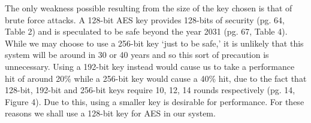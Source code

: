 \documentclass[12pt, titlepage]{article}
\begin{document}
The only weakness possible resulting from the size of the key chosen is that of brute force attacks. A 128-bit AES key provides 128-bits of security (pg. 64, Table 2) and is speculated to be safe beyond the year 2031 (pg. 67, Table 4).\cite{nistKeys}
While we may choose to use a 256-bit key `just to be safe,' it is unlikely that this system will be around in 30 or 40 years and so this sort of precaution is unnecessary. Using a 192-bit key instead would cause us to take a performance hit of around 20\% while a 256-bit key would cause a 40\% hit, due to the fact that 128-bit, 192-bit and 256-bit keys require 10, 12, 14 rounds respectively (pg. 14, Figure 4)\cite{announcingAES}. Due to this, using a smaller key is desirable for performance.
\newline For these reasons we shall use a 128-bit key for AES in our system.
\end{document}

